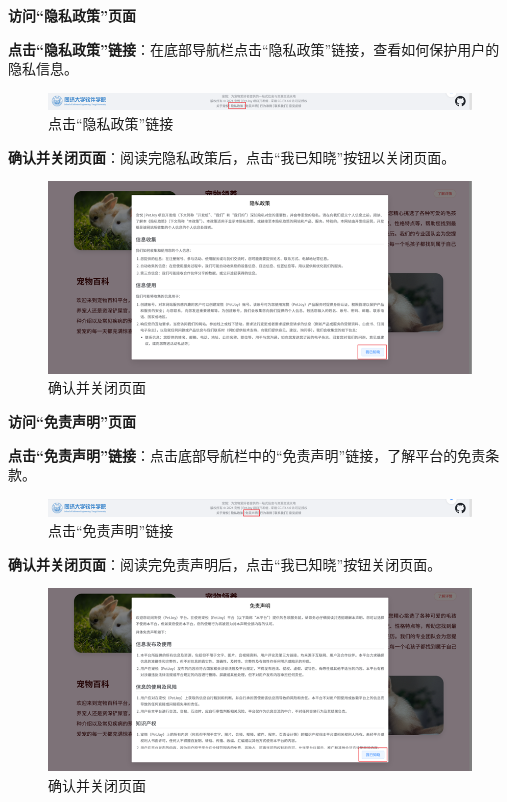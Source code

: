 \begin{itemize}
	\textbf{访问“隐私政策”页面}

	\textbf{点击“隐私政策”链接}：在底部导航栏点击“隐私政策”链接，查看如何保护用户的隐私信息。

	\begin{figure}[H]
		\centering
		\includegraphics[scale=0.8]{figures/FooterNavigationBar4.png} 
		\caption{点击“隐私政策”链接}
	\end{figure}

	\textbf{确认并关闭页面}：阅读完隐私政策后，点击“我已知晓”按钮以关闭页面。

	\begin{figure}[H]
		\centering
		\includegraphics[scale=0.8]{figures/FooterNavigationBar5.png} 
		\caption{确认并关闭页面}
	\end{figure}

	\textbf{访问“免责声明”页面}

	\textbf{点击“免责声明”链接}：点击底部导航栏中的“免责声明”链接，了解平台的免责条款。

	\begin{figure}[H]
		\centering
		\includegraphics[scale=0.8]{figures/FooterNavigationBar6.png} 
		\caption{点击“免责声明”链接}
	\end{figure}

	\textbf{确认并关闭页面}：阅读完免责声明后，点击“我已知晓”按钮关闭页面。

	\begin{figure}[H]
		\centering
		\includegraphics[scale=0.8]{figures/FooterNavigationBar7.png} 
		\caption{确认并关闭页面}
	\end{figure}


\end{itemize}
